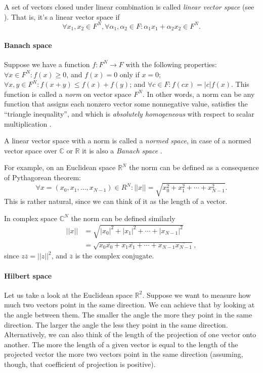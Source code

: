 \documentclass[10pt]{article}
\begin{document}
A set of vectors closed under linear combination is called {\it linear vector
space} (see \cite{Petersen2012}). That is, it's a linear vector space if
$$\forall x_1, x_2 \in F^N, \forall \alpha_1, \alpha_2 \in F: \alpha_1 x_1 +
\alpha_2 x_2 \in F^N.$$

\paragraph{Banach space} Suppose we have a function $f: F^N \to F$ with the
following properties: $\forall x \in F^N: f(x) \ge 0$, and $f(x)=0$ only if
$x=0$; $\forall x,y \in F^N: f(x+y) \le f(x)+f(y)$; and $\forall c \in F:
f(cx)=|c|f(x)$. This function is called a {\it norm} on vector space $F^N$. In
other words, a norm can be any function that assigns each nonzero vector some
nonnegative value, satisfies the ``triangle inequality'', and
which is {\it absolutely homogeneous} with respect to scalar multiplication 
\cite{Axler1997}\cite{Smith}.

A linear vector space with a norm is called a {\it normed space}, in case of a
normed vector space over $\mathbb{C}$ or $\mathbb{R}$ it is also a {\it Banach
space} \cite{Jain1995}.

For example, on an Euclidean space $\mathbb{R}^N$ the norm can be defined as a
consequence of Pythagorean theorem: $$\forall x=(x_0, x_1, \ldots, x_{N-1})\in
R^N: ||x||=\sqrt{x_0^2+x_1^2+\cdots+x_{N-1}^2}.$$
This is rather natural, since we can think of it as the length of a vector.

In complex space $\mathbb{C}^N$ the norm can be defined similarly
\begin{align*}
 ||x||&= \sqrt{|x_0|^2+|x_1|^2+\cdots+|x_{N-1}|^2} \\
   &= \sqrt{x_0\overline{x_0}+x_1\overline{x_1}+\cdots+x_{N-1}\overline{x_{N-1}}},
\end{align*}
since $z\overline{z}=||z||^2$, and $\overline{z}$ is the complex conjugate.

\paragraph{Hilbert space} Let us take a look at the Euclidean space
$\mathbb{R}^2$.  Suppose we want to measure how much two vectors point in the
same direction. We can achieve that by looking at the angle between them. The
smaller the angle the more they point in the same direction. The larger the
angle the less they point in the same direction. Alternatively, we can also
think of the length of the projection of one vector onto another. The more the
length of a given vector is equal to the length of the projected vector the
more two vectors point in the same direction (assuming, though, that
coefficient of projection is positive).
\end{document}
